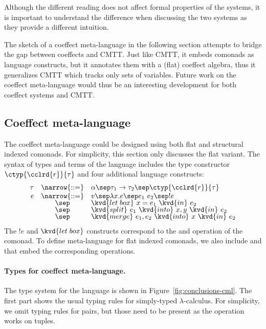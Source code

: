 \noindent
Although the different reading does not affect formal properties of the systems, it is important
to understand the difference when discussing the two systems as they provide a different
intuition.

The sketch of a coeffect meta-language in the following section attempts to bridge the gap
between coeffects and CMTT. Just like CMTT, it embeds comonads as language constructs, but
it annotates them with a (flat) coeffect algebra, thus it generalizes CMTT which tracks only
sets of variables. Future work on the coeffect meta-language would thus be an interesting
development for both coeffect systems and CMTT.


\subsection{Coeffect meta-language}

The coeffect meta-language could be designed using both flat and structural indexed comonads.
For simplicity, this section only discusses the flat variant. The syntax of types and terms
of the language includes the type constructor $\ctyp{\cclrd{r}}{\tau}$ and four additional
language constructs:
%
\begin{equation*}
\begin{array}{rcl}
 \tau &\narrow{::=}& \alpha \sep \tau_1 \rightarrow \tau_2 \sep \ctyp{\cclrd{r}}{\tau}\\
 e &\narrow{::=}& v \sep \lambda x.e \sep e_1~e_2 \sep !e    \\[-0.25em]
  &        \sep& \kvd{let\;box}~x=e_1~\kvd{in}~e_2           \\[-0.25em]
  &        \sep& \kvd{split}~e_1~\kvd{into}~x,y~\kvd{in}~e_2 \\[-0.25em]
  &        \sep& \kvd{merge}~e_1, e_2~\kvd{into}~x~\kvd{in}~e_2
\end{array}
\end{equation*}
%
The $!e$ and $\kvd{let\;box}$ constructs correspond to the  and 
operation of the comonad. To define meta-language for flat indexed comonads, we also include
 and  that embed the corresponding operations.

\paragraph{Types for coeffect meta-language.}
The type system for the language is shown in Figure~\ref{fig:conclusions-cml}. The first part
shows the usual typing rules for simply-typed $\lambda$-calculus. For simplicity, we omit typing
rules for pairs, but those need to be present as the  operation works on tuples.

